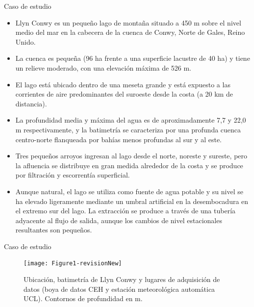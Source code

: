 \documentclass[
10pt,
aspectratio=169,
]{beamer}
\begin{document}
\begin{frame}{Caso de estudio}
\begin{itemize}
\item Llyn Conwy es un pequeño lago de montaña situado a 450 m sobre el nivel medio del mar en la cabecera de la cuenca de Conwy, Norte de Gales, Reino Unido. 
\item La cuenca es pequeña (96 ha frente a una superficie lacustre de 40 ha) y tiene un relieve moderado, con una elevación máxima de 526 m. 
\item El lago está ubicado dentro de una meseta grande y está expuesto a las corrientes de aire predominantes del suroeste desde la costa (a 20 km de distancia). 
\item La profundidad media y máxima del agua es de aproximadamente 7,7 y 22,0 m respectivamente, y la batimetría se caracteriza por una profunda cuenca centro-norte flanqueada por bahías menos profundas al sur y al este. 
\item Tres pequeños arroyos ingresan al lago desde el norte, noreste y sureste, pero la afluencia se distribuye en gran medida alrededor de la costa y se produce por filtración y escorrentía superficial. 
\item Aunque natural, el lago se utiliza como fuente de agua potable y su nivel se ha elevado ligeramente mediante un umbral artificial en la desembocadura en el extremo sur del lago. La extracción se produce a través de una tubería adyacente al flujo de salida, aunque los cambios de nivel estacionales resultantes son pequeños.
\end{itemize}
\end{frame}

\begin{frame}{Caso de estudio}
\begin{figure}[!htbp]
  \begin{center}
    \texttt{[image: Figure1-revisionNew]}
    \caption{\tiny Ubicación, batimetría de Llyn Conwy y lugares de adquisición de datos (boya de datos CEH y estación meteorológica automática UCL). Contornos de profundidad en m.}
    \label{llyn_conwy_ba}
  \end{center}
\end{figure}
\end{frame}
\end{document}
